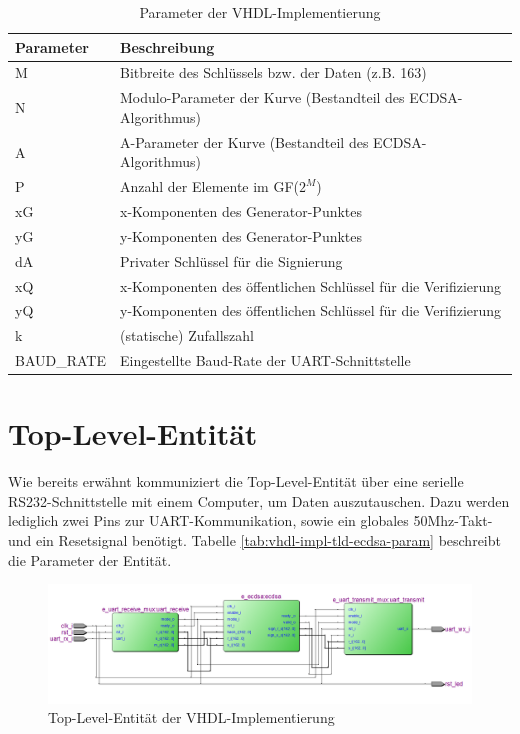 \begin{table} [h]
	\centering 
	\begin{tabular}{ | p{3cm} | p{12cm} | }
		\hline
		\textbf{Parameter} & \textbf{Beschreibung}\\
		\hline
		M & Bitbreite des Schlüssels bzw. der Daten (z.B. 163) \\
		\hline
		N & Modulo-Parameter der Kurve (Bestandteil des ECDSA-Algorithmus) \\
		\hline
		A & A-Parameter der Kurve (Bestandteil des ECDSA-Algorithmus) \\
		\hline
		P & Anzahl der Elemente im GF($2^M$) \\
		\hline
		xG & x-Komponenten des Generator-Punktes \\
		\hline
		yG & y-Komponenten des Generator-Punktes \\
		\hline
		dA & Privater Schlüssel für die Signierung \\
		\hline
		xQ & x-Komponenten des öffentlichen Schlüssel für die Verifizierung \\
		\hline
		yQ & y-Komponenten des öffentlichen Schlüssel für die Verifizierung \\
		\hline
		k & (statische) Zufallszahl \\
		\hline
		BAUD\_RATE & Eingestellte Baud-Rate der UART-Schnittstelle \\
		\hline
	\end{tabular}
	\caption{Parameter der VHDL-Implementierung}
	\label{tab:vhdl-impl-param}
\end{table}



\section{Top-Level-Entität}
\label{vhdl-impl-tld}

Wie bereits erwähnt kommuniziert die Top-Level-Entität über eine serielle RS232-Schnittstelle mit einem Computer, um Daten auszutauschen. Dazu werden lediglich zwei Pins zur UART-Kommunikation, sowie ein globales 50Mhz-Takt- und ein Resetsignal benötigt. Tabelle \ref{tab:vhdl-impl-tld-ecdsa-param} beschreibt die Parameter der Entität. \\

\begin{figure}[thb]
	\centering
	\includegraphics[width=\textwidth]{bilder/tle}
	\caption{Top-Level-Entität der VHDL-Implementierung}
	\label{fig:vhdl-impl-tle}
\end{figure}

